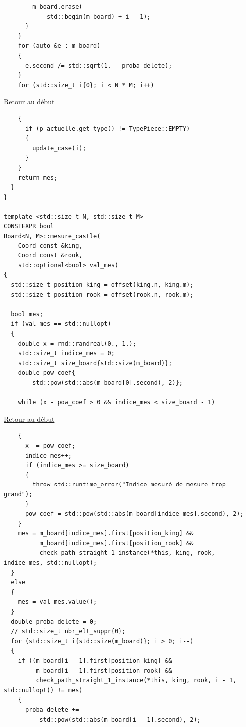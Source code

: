 {\begin{frame}[fragile]
\begin{verbatim}
        m_board.erase(
            std::begin(m_board) + i - 1);
      }
    }
    for (auto &e : m_board)
    {
      e.second /= std::sqrt(1. - proba_delete);
    }
    for (std::size_t i{0}; i < N * M; i++)
\end{verbatim}
\end{frame}

\begin{frame}[fragile]
\hyperlink{conclusion}{Retour au début}\newline
\begin{verbatim}
    {
      if (p_actuelle.get_type() != TypePiece::EMPTY)
      {
        update_case(i);
      }
    }
    return mes;
  }
}

template <std::size_t N, std::size_t M>
CONSTEXPR bool
Board<N, M>::mesure_castle(
    Coord const &king,
    Coord const &rook,
    std::optional<bool> val_mes)
{
  std::size_t position_king = offset(king.n, king.m);
  std::size_t position_rook = offset(rook.n, rook.m);

  bool mes;
  if (val_mes == std::nullopt)
  {
    double x = rnd::randreal(0., 1.);
    std::size_t indice_mes = 0;
    std::size_t size_board{std::size(m_board)};
    double pow_coef{
        std::pow(std::abs(m_board[0].second), 2)};

    while (x - pow_coef > 0 && indice_mes < size_board - 1)
\end{verbatim}
\end{frame}

\begin{frame}[fragile]
\hyperlink{conclusion}{Retour au début}\newline
\begin{verbatim}
    {
      x -= pow_coef;
      indice_mes++;
      if (indice_mes >= size_board)
      {
        throw std::runtime_error("Indice mesuré de mesure trop grand");
      }
      pow_coef = std::pow(std::abs(m_board[indice_mes].second), 2);
    }
    mes = m_board[indice_mes].first[position_king] &&
          m_board[indice_mes].first[position_rook] &&
          check_path_straight_1_instance(*this, king, rook, indice_mes, std::nullopt);
  }
  else
  {
    mes = val_mes.value();
  }
  double proba_delete = 0;
  // std::size_t nbr_elt_suppr{0};
  for (std::size_t i{std::size(m_board)}; i > 0; i--)
  {
    if ((m_board[i - 1].first[position_king] &&
         m_board[i - 1].first[position_rook] &&
         check_path_straight_1_instance(*this, king, rook, i - 1, std::nullopt)) != mes)
    {
      proba_delete +=
          std::pow(std::abs(m_board[i - 1].second), 2);


\end{verbatim}
\end{frame}}
